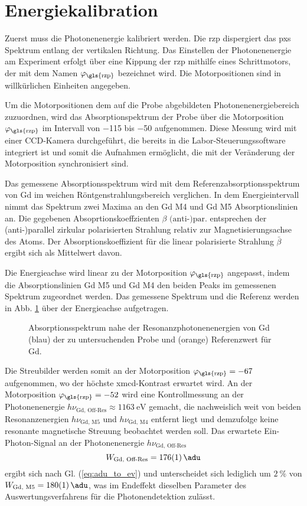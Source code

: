 \section{Energiekalibration}
Zuerst muss die Photonenenergie kalibriert werden. Die \gls{rzp} dispergiert das \gls{pxs} Spektrum entlang der vertikalen Richtung. Das Einstellen der Photonenenergie am Experiment erfolgt über eine Kippung der \gls{rzp} mithilfe eines Schrittmotors, der mit dem Namen $\varphi_\text{\gls{rzp}}$ bezeichnet wird. Die Motorpositionen sind in willkürlichen Einheiten angegeben.

\noindent
Um die Motorpositionen dem auf die Probe abgebildeten Photonenenergiebereich zuzuordnen, wird das Absorptionspektrum der Probe über die Motorposition $\varphi_\text{\gls{rzp}}$ im Intervall von \num{-115} bis \num{-50} aufgenommen. Diese Messung wird mit einer CCD-Kamera durchgeführt, die bereits in die Labor-Steuerungssoftware integriert ist und somit die Aufnahmen ermöglicht, die mit der Veränderung der Motorposition synchronisiert sind.

\noindent
Das gemessene Absorptionsspektrum wird mit dem Referenzabsorptionsspektrum von Gd im weichen Röntgenstrahlungsbereich verglichen. In dem Energieintervall nimmt das Spektrum zwei Maxima an den Gd M4 und Gd M5 Absorptionslinien an. Die gegebenen \cite[Abb. 2]{prieto-x-ray-2005} Absoprtionskoeffzienten $\beta \text{ (anti-)par.}$ entsprechen der (anti-)parallel zirkular polarisierten Strahlung relativ zur Magnetisierungsachse des Atoms. Der Absorptionskoeffizient für die linear polarisierte Strahlung $\bar{\beta}$ ergibt sich als Mittelwert davon.

\noindent
Die Energieachse wird linear zu der Motorposition $\varphi_\text{\gls{rzp}}$ angepasst, indem die Absorptionslinien Gd M5 und Gd M4 den beiden Peaks im gemessenen Spektrum zugeordnet werden. Das gemessene Spektrum und die Referenz werden in Abb. \ref{fig:rzp_phi_ev} über der Energieachse aufgetragen.
\begin{figure}[H]
    \centering
    
    \caption{Absorptionsspektrum nahe der Resonanzphotonenenergien von Gd (blau) der zu untersuchenden Probe und (orange) Referenzwert für Gd.}
    \label{fig:rzp_phi_ev}
\end{figure}
\noindent
Die Streubilder werden somit an der Motorposition $\varphi_\text{\gls{rzp}} = \num{-67}$ aufgenommen, wo der höchste \gls{xmcd}-Kontrast erwartet wird. An der Motorposition $\varphi_\text{\gls{rzp}} = \num{-52}$ wird eine Kontrollmessung an der Photonenenergie $h\nu_\text{Gd, Off-Res} \approx \SI{1163}{\eV}$ gemacht, die nachweislich weit von beiden Resonanzenergien $h\nu_\text{Gd, M5}$ und $h\nu_\text{Gd, M4}$ entfernt liegt und demzufolge keine resonante magnetische Streuung beobachtet werden soll. Das erwartete Ein-Photon-Signal an der Photonenenergie $h\nu_\text{Gd, Off-Res}$ 
\begin{equation}
    W_\text{Gd, Off-Res} = \SI{176(1)}{\adu}
\end{equation}
ergibt sich nach Gl. (\ref{eq:adu_to_ev}) und unterscheidet sich lediglich um $\SI{2}{\percent}$ von $W_\text{Gd, M5} = \SI{180(1)}{\adu}$, was im Endeffekt dieselben Parameter des Auswertungsverfahrens für die Photonendetektion zulässt.

